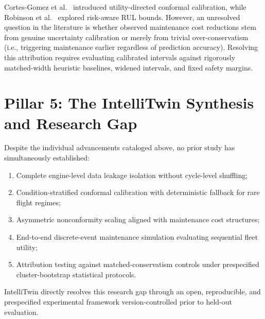 Cortes-Gomez et al.~\cite{cortesgomez2025utility} introduced utility-directed conformal calibration, while Robinson et al.~\cite{robinson2026riskaware} explored risk-aware RUL bounds. However, an unresolved question in the literature is whether observed maintenance cost reductions stem from genuine uncertainty calibration or merely from trivial over-conservatism (i.e., triggering maintenance earlier regardless of prediction accuracy). Resolving this attribution requires evaluating calibrated intervals against rigorously matched-width heuristic baselines, widened intervals, and fixed safety margins.

\section{Pillar 5: The IntelliTwin Synthesis and Research Gap}
Despite the individual advancements cataloged above, no prior study has simultaneously established:
\begin{enumerate}
    \item Complete engine-level data leakage isolation without cycle-level shuffling;
    \item Condition-stratified conformal calibration with deterministic fallback for rare flight regimes;
    \item Asymmetric nonconformity scaling aligned with maintenance cost structures;
    \item End-to-end discrete-event maintenance simulation evaluating sequential fleet utility;
    \item Attribution testing against matched-conservatism controls under prespecified cluster-bootstrap statistical protocols.
\end{enumerate}
IntelliTwin directly resolves this research gap through an open, reproducible, and prespecified experimental framework version-controlled prior to held-out evaluation.
